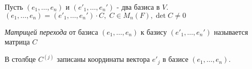 \bigskip


\begin{definition}
    
    Пусть $(e_1, \dots, e_n)$ и $(e'_1, \dots, e_n')$ - два базиса в $V$. $(e_1, \dots, e_n) = (e'_1, \dots, e_n') \cdot C, \; C \in M_n(F), \det C \not= 0$

    \textit{Матрицей перехода} от базиса $(e_1, \dots, e_n)$ к базису $(e'_1, \dots, e_n')$ называется матрица $C$

    В столбце $C^{(j)}$ записаны координаты вектора $e'_j$ в базисе $(e_1, \dots, e_n)$.

    \begin{comment}
        
        Из свойства следует, что $(e_1, \dots, e_n) = (e'_1, \dots, e'_n) \cdot C^{-1}$

    \end{comment}

\end{definition}


\bigskip


